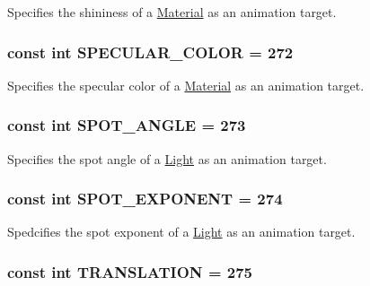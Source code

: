 Specifies the shininess of a \hyperlink{classm3g_1_1Material}{Material} as an animation target. \hypertarget{classm3g_1_1AnimationTrack_a0119030157ee8a5ef4f8ce88771447b}{
\subsubsection[{SPECULAR\_\-COLOR}]{\setlength{\rightskip}{0pt plus 5cm}const int {\bf SPECULAR\_\-COLOR} = 272}}
\label{classm3g_1_1AnimationTrack_a0119030157ee8a5ef4f8ce88771447b}


Specifies the specular color of a \hyperlink{classm3g_1_1Material}{Material} as an animation target. \hypertarget{classm3g_1_1AnimationTrack_c1d6b5313ef35ef100889ca885901db2}{
\subsubsection[{SPOT\_\-ANGLE}]{\setlength{\rightskip}{0pt plus 5cm}const int {\bf SPOT\_\-ANGLE} = 273}}
\label{classm3g_1_1AnimationTrack_c1d6b5313ef35ef100889ca885901db2}


Specifies the spot angle of a \hyperlink{classm3g_1_1Light}{Light} as an animation target. \hypertarget{classm3g_1_1AnimationTrack_90c55bd356e55166244416c6f758ea94}{
\subsubsection[{SPOT\_\-EXPONENT}]{\setlength{\rightskip}{0pt plus 5cm}const int {\bf SPOT\_\-EXPONENT} = 274}}
\label{classm3g_1_1AnimationTrack_90c55bd356e55166244416c6f758ea94}


Spedcifies the spot exponent of a \hyperlink{classm3g_1_1Light}{Light} as an animation target. \hypertarget{classm3g_1_1AnimationTrack_a691826dccd8c22144e61216de4f680c}{
\subsubsection[{TRANSLATION}]{\setlength{\rightskip}{0pt plus 5cm}const int {\bf TRANSLATION} = 275}}
\label{classm3g_1_1AnimationTrack_a691826dccd8c22144e61216de4f680c}


